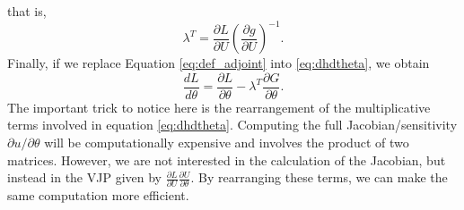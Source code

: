 that is,
\begin{equation}
    \lambda^T = \frac{\partial L}{\partial U} \left( \frac{\partial g}{\partial U} \right)^{-1}.
    \label{eq:def_adjoint}
\end{equation}
Finally, if we replace Equation \eqref{eq:def_adjoint} into \eqref{eq:dhdtheta}, we obtain 
\begin{equation}
    \frac{dL}{d\theta} 
    =
    \frac{\partial L}{\partial \theta} 
    - 
    \lambda^T \frac{\partial G}{\partial \theta}.
    \label{eq:gradient-adjoint-state-method}
\end{equation}
The important trick to notice here is the rearrangement of the multiplicative terms involved in equation \eqref{eq:dhdtheta}. Computing the full Jacobian/sensitivity $\partial u / \partial \theta$ will be computationally expensive and involves the product of two matrices. However, we are not interested in the calculation of the Jacobian, but instead in the VJP given by $\frac{\partial L}{\partial U} \frac{\partial U}{\partial \theta}$. By rearranging these terms, we can make the same computation more efficient. 


